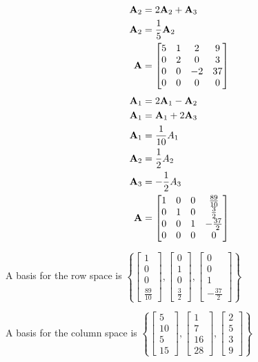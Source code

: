 \documentclass{article}
\begin{document}
\begin{align*}
	\mathbf{A}_2 & = 2\mathbf{A}_2 + \mathbf{A}_3 \\
	\mathbf{A}_2 & = \frac{1}{5}\mathbf{A}_2 \\
	\mathbf{A} & =
		\begin{bmatrix}
			5 & 1 & 2 & 9 \\
			0 & 2 & 0 & 3 \\
			0 & 0 & -2 & 37 \\
			0 & 0 & 0 & 0
		\end{bmatrix}
\end{align*}
\begin{align*}
	\mathbf{A}_1 & = 2\mathbf{A}_1 - \mathbf{A}_2 \\
	\mathbf{A}_1 & = \mathbf{A}_1 + 2\mathbf{A}_3 \\
	\mathbf{A}_1 & = \frac{1}{10}A_1 \\
	\mathbf{A}_2 & = \frac{1}{2}A_2 \\
	\mathbf{A}_3 & = -\frac{1}{2}A_3 \\
	\mathbf{A} & =
		\begin{bmatrix}
			1 & 0 & 0 & \frac{89}{10} \\
			0 & 1 & 0 & \frac{3}{2}\\
			0 & 0 & 1 & -\frac{37}{2} \\
			0 & 0 & 0 & 0
		\end{bmatrix}
\end{align*}
\begin{mdframed}
	A basis for the row space is
	$ \left\{
		\begin{bmatrix} 1 \\ 0 \\ 0 \\ \frac{89}{10} \end{bmatrix},
		\begin{bmatrix} 0 \\ 1 \\ 0 \\ \frac{3}{2} \end{bmatrix},
		\begin{bmatrix} 0 \\ 0 \\ 1 \\ -\frac{37}{2} \end{bmatrix}
	\right\} $
	
	A basis for the column space is
	$ \left\{
		\begin{bmatrix} 5 \\ 10 \\ 5 \\ 15 \end{bmatrix},
		\begin{bmatrix} 1 \\ 7 \\ 16 \\ 28 \end{bmatrix},
		\begin{bmatrix} 2 \\ 5 \\ 3 \\ 9 \end{bmatrix}
	\right\} $
\end{mdframed}
\end{document}
